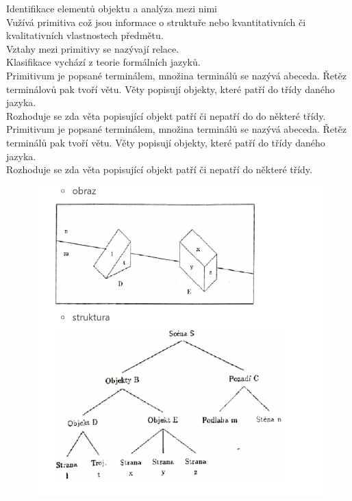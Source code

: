 Identifikace elementů objektu a analýza mezi nimi\\
Vužívá primitiva což jsou informace o struktuře nebo kvantitativních či kvalitativních vlastnostech předmětu.\\
Vztahy mezi primitivy se nazývají relace.\\
Klasifikace vychází z teorie formálních jazyků.\\
Primitivum je popsané terminálem, množina terminálů se nazývá abeceda. Řetěz terminálovů pak tvoří větu. Věty popisují objekty, které patří do třídy daného jazyka.\\
Rozhoduje se zda věta popisující objekt patří či nepatří do do některé třídy.\\
Primitivum je popsané terminálem, množina terminálů se nazývá abeceda. Řetěz terminálů pak tvoří větu. Věty popisují objekty, které patří do třídy daného jazyka.\\
Rozhoduje se zda věta popisující objekt patří či nepatří do některé třídy.\\
\begin{figure}[H]
    \includegraphics[scale = 0.7]{images/syntakticke.png}
\end{figure}
